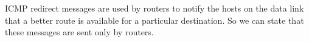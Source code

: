 ICMP redirect messages are used by routers to notify the hosts on the data link that a better route is available for a particular destination. So we can state that these messages are sent only by routers.